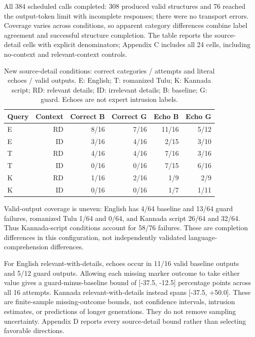 \documentclass[manuscript,screen,review,anonymous]{acmart}
\begin{document}
All 384 scheduled calls completed: 308 produced valid structures and 76 reached the output-token limit with incomplete responses; there were no transport errors. Coverage varies across conditions, so apparent category differences combine label agreement and successful structure completion. The table reports the source-detail cells with explicit denominators; Appendix C includes all 24 cells, including no-context and relevant-context controls.
\begin{table}[htbp]
\caption{New source-detail conditions: correct categories / attempts and literal echoes / valid outputs. E: English; T: romanized Tulu; K: Kannada script; RD: relevant details; ID: irrelevant details; B: baseline; G: guard. Echoes are not expert intrusion labels.}
\label{tab:new-main}
\centering
\begin{tabular}{@{}lrrrrr@{}}
\toprule
Query & Context & Correct B & Correct G & Echo B & Echo G \\
\midrule
E & RD & 8/16 & 7/16 & 11/16 & 5/12 \\
E & ID & 3/16 & 4/16 & 2/15 & 3/10 \\
T & RD & 4/16 & 4/16 & 7/16 & 3/16 \\
T & ID & 0/16 & 0/16 & 7/15 & 6/16 \\
K & RD & 1/16 & 2/16 & 1/9 & 2/9 \\
K & ID & 0/16 & 0/16 & 1/7 & 1/11 \\
\bottomrule
\end{tabular}
\end{table}

Valid-output coverage is uneven: English has 4/64 baseline and 13/64 guard failures, romanized Tulu 1/64 and 0/64, and Kannada script 26/64 and 32/64. Thus Kannada-script conditions account for 58/76 failures. These are completion differences in this configuration, not independently validated language-comprehension differences.

For English relevant-with-details, echoes occur in 11/16 valid baseline outputs and 5/12 guard outputs. Allowing each missing marker outcome to take either value gives a guard-minus-baseline bound of [-37.5, -12.5] percentage points across all 16 attempts. Kannada relevant-with-details instead spans [-37.5, +50.0]. These are finite-sample missing-outcome bounds, not confidence intervals, intrusion estimates, or predictions of longer generations. They do not remove sampling uncertainty. Appendix D reports every source-detail bound rather than selecting favorable directions.
\end{document}
